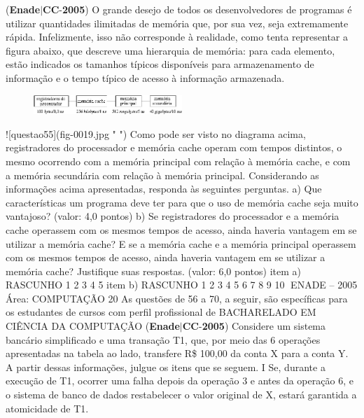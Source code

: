 \documentclass{exam}
\begin{document}
\begin{questions}
\begin{enumerate}[label=\alph*)]
	\end{enumerate}

\question (\textbf{Enade}$|$\textbf{CC}-\textbf{2005}) O grande desejo de todos os desenvolvedores de programas é utilizar quantidades ilimitadas de memória que, por sua vez,
seja extremamente rápida. Infelizmente, isso não corresponde à realidade, como tenta representar a figura abaixo, que descreve
uma hierarquia de memória: para cada elemento, estão indicados os tamanhos típicos disponíveis para armazenamento de
informação e o tempo típico de acesso à informação armazenada.
\begin{figure}[H]
	\begin{center}
		\includegraphics[width=0.5\textwidth]{CIENCIA_DA_COMPUTACAO_Prova2005-utf8_figuras/fig-0019.jpg}
		\caption{ }
	\end{center}
\end{figure}
![questao55](fig-0019.jpg " ")
Como pode ser visto no diagrama acima, registradores do processador e memória cache operam com tempos distintos, o
mesmo ocorrendo com a memória principal com relação à memória cache, e com a memória secundária com relação à memória
principal.
Considerando as informações acima apresentadas, responda às seguintes perguntas.
a) Que características um programa deve ter para que o uso de memória cache seja muito vantajoso? (valor: 4,0 pontos)
b) Se registradores do processador e a memória cache operassem com os mesmos tempos de acesso, ainda haveria vantagem em se
utilizar a memória cache? E se a memória cache e a memória principal operassem com os mesmos tempos de acesso, ainda haveria
vantagem em se utilizar a memória cache? Justifique suas respostas. (valor: 6,0 pontos)
item a) RASCUNHO
1
2
3
4
5
item b) RASCUNHO
1
2
3
4
5
6
7
8
9
10
ENADE – 2005 Área: COMPUTAÇÃO 20
As questões de 56 a 70, a seguir, são específicas para os estudantes de cursos com perfil profissional de
BACHARELADO EM CIÊNCIA DA COMPUTAÇÃO
\question (\textbf{Enade}$|$\textbf{CC}-\textbf{2005}) Considere um sistema bancário
simplificado e uma transação T1,
que, por meio das 6 operações
apresentadas na tabela ao lado,
transfere R\$ 100,00 da conta X
para a conta Y. A partir dessas
informações, julgue os itens que se
seguem.
I Se, durante a execução de T1,
ocorrer uma falha depois da
operação 3 e antes da operação
6, e o sistema de banco de dados
restabelecer o valor original
de X, estará garantida a atomicidade de T1.

\end{questions}
\end{document}
